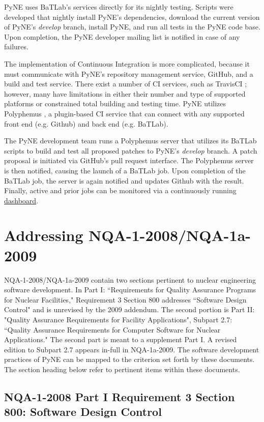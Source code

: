 \documentclass{anstrans}
\begin{document}
PyNE uses BaTLab's services directly for its nightly testing. Scripts were
developed that nightly install PyNE's dependencies, download the current version
of PyNE's \textit{develop} branch, install PyNE, and run all tests in the PyNE
code base. Upon completion, the PyNE developer mailing list is notified in case of
any failures.

The implementation of Continuous Integration is more complicated, because it
must communicate with PyNE's repository management service, GitHub, and a build
and test service. There exist a number of CI services, such as TravisCI
\cite{travis_2014}; however, many have limitations in either their number and
type of supported platforms or constrained total building and testing time. PyNE
utilizes Polyphemus \cite{polyphemus_2014}, a plugin-based CI service that can
connect with any supported front end (e.g. Github) and back end (e.g. BaTLab).

The PyNE development team runs a Polyphemus server that utilizes its BaTLab
scripts to build and test all proposed patches to PyNE's \textit{develop}
branch. A patch proposal is initiated via GitHub's pull request
interface. The Polyphemus server is then notified, causing the launch of a
BaTLab job. Upon completion of the BaTLab job, the server is again notified and
updates Github with the result. Finally, active and prior jobs can be monitored
via a continuously running \href{http://gorgus.pyne.io/dashboard}{dashboard}.


\section{Addressing NQA-1-2008/NQA-1a-2009}

NQA-1-2008/NQA-1a-2009 contain two sections pertinent to nuclear engineering
software development. In Part I: ``Requirements for Quality Assurance Programs
for Nuclear Facilities," Requirement 3 Section 800 addresses ``Software Design
Control" and is unrevised by the 2009 addendum. The second portion is Part II:
"Quality Assurance Requirements for Facility Applications", Subpart 2.7:
``Quality Assurance Requirements for Computer Software for Nuclear
Applications." The second part is meant to a supplement Part I. A revised
edition to Subpart 2.7 appears in-full in NQA-1a-2009. The software development
practices of PyNE can be mapped to the criterion set forth by these documents.
The section heading below refer to pertinent items within these documents.

\subsection{NQA-1-2008 Part I Requirement 3 Section 800: Software Design Control}
\end{document}

